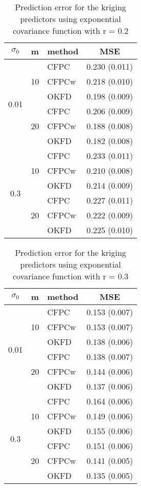 \begin{table}
	\begin{center}
	\caption{Prediction error for the kriging predictors using exponential covariance function with r = 0.2}
		\begin{tabular}
			{|c|c|l|c|} \hline $\sigma_0$ & m & method & MSE \\
			\hline \multirow{6}{*}{0.01}& \multirow{3}{*}{10}
			  &CFPC&  0.230  (0.011)  \\
			& &CFPCw& 0.218  (0.010)  \\
			& &OKFD& 0.198  (0.009) \\
			\cline{2-4} & \multirow{3}{*}{20}
			  &CFPC& 0.206  (0.009) \\
			& &CFPCw&  0.188  (0.008)  \\
			& &OKFD& 0.182  (0.008)  \\
			\hline \multirow{6}{*}{0.3}& \multirow{3}{*}{10}
			  &CFPC& 0.233  (0.011)   \\
			& &CFPCw& 0.210  (0.008) \\
			& &OKFD& 0.214  (0.009)  \\
			\cline{2-4} & \multirow{3}{*}{20}
			  &CFPC& 0.227  (0.011)  \\
			& &CFPCw& 0.222  (0.009)  \\
			& &OKFD& 0.225  (0.010)  \\
			\hline
		\end{tabular}
	\label{tab:kriging_pred}
	\end{center}
\end{table}

\begin{table}
	\begin{center}
	\caption{Prediction error for the kriging predictors using exponential covariance function with r = 0.3}
		\begin{tabular}{|c|c|l|c|} \hline
			$\sigma_0$ & m & method & MSE \\
			\hline
			\multirow{6}{*}{0.01}& \multirow{3}{*}{10}
			  &CFPC&  0.153  (0.007)  \\
			& &CFPCw& 0.153  (0.007)  \\
			& &OKFD& 0.138  (0.006) \\
			\cline{2-4} & \multirow{3}{*}{20}
			  &CFPC& 0.138  (0.007) \\
			& &CFPCw&  0.144  (0.006)  \\
			& &OKFD& 0.137  (0.006) \\
			\hline \multirow{6}{*}{0.3}& \multirow{3}{*}{10}
			  &CFPC& 0.164  (0.006)  \\
			& &CFPCw& 0.149  (0.006) \\
			& &OKFD& 0.155  (0.006) \\
			\cline{2-4} & \multirow{3}{*}{20}
			  &CFPC& 0.151  (0.006)  \\
			& &CFPCw& 0.141  (0.005) \\
			& &OKFD& 0.135  (0.005)  \\
			\hline
		\end{tabular}
	\label{tab:kriging_pred_2}
	\end{center}
\end{table}

